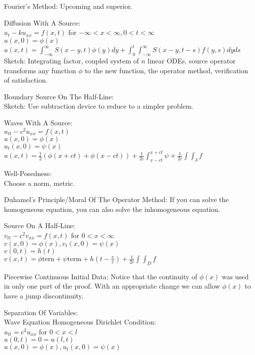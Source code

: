 Fourier's Method: Upcoming and superior.

Diffusion With A Source: \\
$u_t-ku_{xx}=f(x,t)$ for $ -\infty<x<\infty, 0<t<\infty$ \\
$u(x,0)=\phi (x)$ \\
$u(x,t)=\int_{-\infty}^{\infty} S(x-y,t) \phi (y) dy + \int_0^t \int_{-\infty}^{\infty} S(x-y,t-s) f(y,s) dy ds$ \\
Sketch: Integrating factor, coupled system of $n$ linear ODEs, source operator transforms any function $\phi$ to the new function, the operator method, verification of satisfaction.

Boundary Source On The Half-Line: \\
Sketch: Use subtraction device to reduce to a simpler problem.

Waves With A Source: \\
$u_{tt}-c^2 u_{xx}=f(x,t)$ \\
$u(x,0)=\phi (x)$ \\
$u_t (x,0)=\psi (x)$ \\
$u(x,t) = \frac{1}{2}(\phi (x+ct)+\phi (x-ct))+\frac{1}{2c}\int_{x-ct}^{x+ct} \psi + \frac{1}{2c} \int \int_{\delta} f$

Well-Posedness: \\
Choose a norm, metric.

Duhamel's Principle/Moral Of The Operator Method: If you can solve the homogeneous equation, you can also solve the inhomogeneous equation.

Source On A Half-Line: \\
$v_{tt}-c^2 v_{xx}=f(x,t)$ for $ 0<x<\infty$ \\
$v(x,0)=\phi (x), v_t (x,0)=\psi (x)$ \\
$v(0,t)=h(t)$ \\
$v(x,t)=\phi \text{tern} + \psi \text{term} + h\left(t-\frac{x}{c} \right) + \frac{1}{2c} \int \int_D f$

Piecewise Continuous Initial Data: Notice that the continuity of $\phi (x)$ was used in only one part of the proof. With an appropriate change we can allow $\phi (x)$ to have a jump discontinuity.

Separation Of Variables: \\
Wave Equation Homogeneous Dirichlet Condition: \\
$u_{tt}=c^2 u_{xx}$ for $ 0<x<l$ \\
$u(0,t)=0=u(l,t)$ \\
$u(x,0)=\phi (x), u_t (x,0)=\psi (x)$

